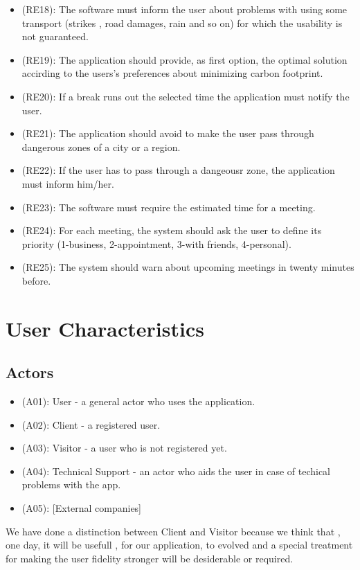 \documentclass[a4paper,leqno]{book}
\begin{document}
\begin{itemize}
	\item (RE18): The software must inform the user about problems with using some transport (strikes , road damages, rain and so on) for which the usability is not guaranteed.
	\item (RE19): The application should provide, as first option, the optimal solution accirding to the users's preferences about minimizing carbon footprint.
	\item (RE20): If a break runs out the selected time the application must notify the user.
	\item (RE21): The application should avoid to make the user pass through dangerous zones of a city or a region.
	\item (RE22): If the user has to pass through a dangeousr zone, the application must inform him/her.
	\item (RE23):  The software must require the estimated time for a meeting.
	\item (RE24): For each meeting, the system should ask the user to define its priority (1-business, 2-appointment, 3-with friends, 4-personal).
	\item (RE25): The system should warn about upcoming meetings in twenty minutes before.
\end{itemize}

\section{User Characteristics}
\subsection{Actors}
\begin{itemize}
	\item (A01): User - a general actor who uses the application.
		\item (A02): Client - a registered user.
		\item (A03): Visitor - a user who is not registered yet.
	\item (A04): Technical Support - an actor who aids the user in case of techical problems with the app.
	\item (A05): [External companies]
\end{itemize}

We have done a distinction between Client and Visitor because we think that , one day, 
it will be usefull , for our application, to evolved and a special treatment for making the 
user fidelity stronger will be desiderable or required.
\end{document}

